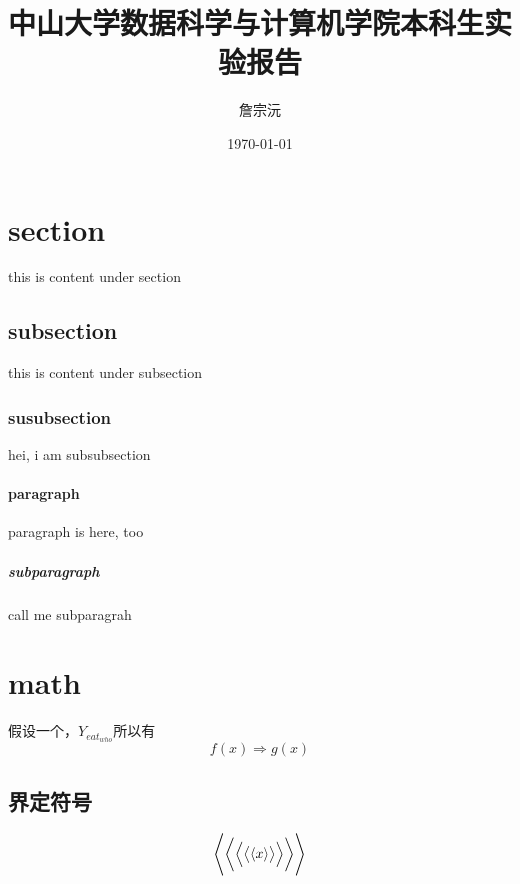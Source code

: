 \documentclass[UTF8]{ctexart}
\title{中山大学数据科学与计算机学院本科生实验报告}
\author{詹宗沅}
\date{\today}
\begin{document}
\maketitle
\tableofcontents


\section{section}
this is content under section
  \subsection{subsection}
  this is content under subsection
    \subsubsection{susubsection}
    hei, i am subsubsection
      \paragraph{paragraph}
      paragraph is here, too
        \subparagraph{subparagraph}
        call me subparagrah


\section{math}
假设一个，$Y_{eat_{who}}$所以有
\begin{equation}
f(x) \Rightarrow g(x)
\end{equation}
  \subsection{界定符号}
  \[ \Biggl\langle\biggl\langle\Bigl\langle\bigl\langle\langle x
  \rangle\bigr\rangle\Bigr\rangle\biggr\rangle\Biggr\rangle \]
\end{document}
